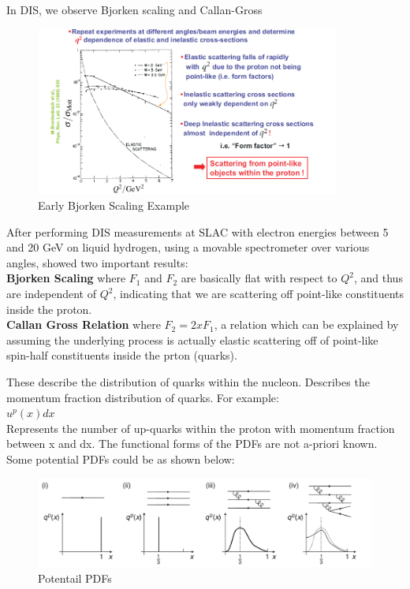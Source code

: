         \indent In DIS, we observe Bjorken scaling and Callan-Gross
        
        \begin{figure}[H]
            \centering
            \includegraphics[width=10cm]{Chapters/Ch1-Intro/Ch1-Sec1-Background/pics/inelastic-ep/DIS.png}
            \caption{Early Bjorken Scaling Example}
        \end{figure}
        
        After performing DIS measurements at SLAC with electron energies between 5 and 20 GeV on liquid hydrogen, using a movable spectrometer over various angles, showed two important results:\\
        \newline
        \textbf{Bjorken Scaling} where $F_1$ and $F_2$ are basically flat with respect to $Q^2$, and thus are independent of $Q^2$, indicating that we are scattering off point-like constituents inside the proton.\\
        \newline
        \textbf{Callan Gross Relation} where $F_2 = 2x F_1$, a relation which can be explained by assuming the underlying process is actually elastic scattering off of point-like spin-half constituents inside the prton (quarks). 

        \indent These describe the distribution of quarks within the nucleon. Describes the momentum fraction distribution of quarks. For example:\\
        \newline
        $u^p(x)dx$\\
        \newline
        Represents the number of up-quarks within the proton with momentum fraction between x and dx. The functional forms of the PDFs are not a-priori known. Some potential PDFs could be as shown below:\\
        
        \begin{figure}[H]
            \centering
            \includegraphics[width=12cm]{Chapters/Ch1-Intro/Ch1-Sec1-Background/pics/inelastic-ep/pdf-possibilities.PNG}
            \caption{Potentail PDFs}
        \end{figure}
        

